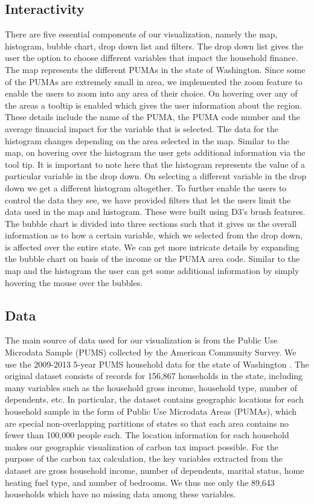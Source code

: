 \documentclass{sigchi}
\begin{document}
\subsection{Interactivity}
There are five essential components of our visualization, namely the map, histogram, bubble chart, drop down list and filters.
The drop down list gives the user the option to choose different variables that impact the household finance.
The map represents the different PUMAs in the state of Washington. Since some of the PUMAs are extremely small in area, we implemented the zoom feature to enable the users to zoom into any area of their choice. On hovering over any of the areas a tooltip is enabled which gives the user information about the region. These details include the name of the PUMA, the PUMA code number and the average financial impact for the variable that is selected.
The data for the histogram changes depending on the area selected in the map. Similar to the map, on hovering over the histogram the user gets additional information via the tool tip. It is important to note here that the histogram represents the value of a particular variable in the drop down. On selecting a different variable in the drop down we get a different histogram altogether.
To further enable the users to control the data they see, we have provided filters that let the users limit the data used in the map and histogram. These were built using D3's brush features. 
The bubble chart is divided into three sections such that it gives us the overall information as to how a certain variable, which we selected from the drop down, is affected over the entire state. We can get more intricate details by expanding the bubble chart on basis of the income or the PUMA area code. Similar to the map and the histogram the user can get some additional information by simply hovering the mouse over the bubbles. 

\subsection{Data}
The main source of data used for our visualization is from the Public Use Microdata Sample (PUMS) collected by the American Community Survey. We use the 2009-2013 5-year PUMS household data for the state of Washington \cite{pums} . The original dataset consists of records for 156,867 households in the state, including many variables such as the household gross income, household type, number of dependents, etc. In particular, the dataset contains geographic locations for each household sample in the form of Public Use Microdata Areas (PUMAs), which are special non-overlapping partitions of states so that each area contains no fewer than 100,000 people each. The location information for each household makes our geographic visualization of carbon tax impact possible. For the purpose of the carbon tax calculation, the key variables extracted from the dataset are gross household income, number of dependents, marital status, home heating fuel type, and number of bedrooms. We thus use only the 89,643 households which have no missing data among these variables. 
\end{document}

